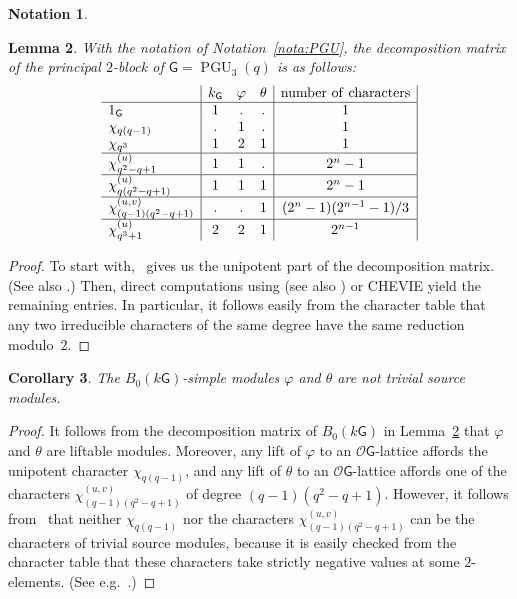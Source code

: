 \documentclass[12pt,a4paper]{amsart}
\theoremstyle{plain}\newtheorem{Theorem}{Theorem}[section]
\theoremstyle{plain}\newtheorem{Conjecture}[Theorem]{Conjecture}
\theoremstyle{plain}\newtheorem{Corollary}[Theorem]{Corollary}
\theoremstyle{plain}\newtheorem{Lemma}[Theorem]{Lemma}
\theoremstyle{plain}\newtheorem{Proposition}[Theorem]{Proposition}
\theoremstyle{definition}\newtheorem{Definition}[Theorem]{Definition}
\theoremstyle{definition}\newtheorem{Example}[Theorem]{Example}
\theoremstyle{definition}\newtheorem{Examples}[Theorem]{Examples}
\theoremstyle{definition}\newtheorem{Remark}[Theorem]{Remark}
\theoremstyle{definition}\newtheorem{Question}[Theorem]{Question}
\theoremstyle{definition}\newtheorem{Notation}[Theorem]{Notation}
\theoremstyle{definition}\newtheorem{Hypothesis}[Theorem]{Hypothesis}
\theoremstyle{definition}\newtheorem{Assumption}[Theorem]{Assumption}
\theoremstyle{definition}\newtheorem{Strategy}[Theorem]{Strategy}
\theoremstyle{definition}\newtheorem{Contents}[Theorem]{Contents}
\theoremstyle{definition}\newtheorem{Computations}[Theorem]{Computations}
\theoremstyle{definition}\newtheorem{Equivalences}[Theorem]{Equivalences}
\theoremstyle{definition}\newtheorem{Notation/Definition}[Theorem]{Notation/Definition}
\theoremstyle{definition}\newtheorem{noth}[Theorem]{}
\theoremstyle{plain}\newtheorem{Step}[Theorem]{Step}
\newcommand{\PGU}{\operatorname{PGU}}
\begin{document}
\begin{Notation}
\end{Notation}




\begin{Lemma}\label{lem:2decPSU3}
With the notation of Notation~\ref{nota:PGU}, the decomposition matrix of the principal $2$-block of $\mathsf{G}=\PGU_3(q)$ is as follows:
%
$$
\begin{array}{l|ccc|c|c} & k_{\mathsf{G}} &\varphi &\theta &\mathrm{number \ of \ characters}\\ 
\noalign{\hrule }
1_{\mathsf{G}}   & 1& . & . & 1 \\ 
\chi_{q(q-1)}& . & 1&.& 1 \\
\chi_{q^3}&1& 2&1& 1 \\
\hline
\chi_{q^2-q+1}^{(u)}&1&1& . & 2^n-1 \\ 
\hline
\chi_{q(q^2-q+1)}^{(u)}&1&1&1&2^n-1 \\
\hline
\chi_{(q-1)(q^2-q+1)}^{\color{black}(u,v)}& . & . &1& (2^n-1)(2^{n-1}-1)/3\\
\hline
\chi_{q^3+1}^{(u)}&2&2&1& 2^{n-1}
\end{array}
$$
\end{Lemma}
\begin{proof}
To start with,~\cite[Appendix]{His04} gives us the unipotent part of the decomposition matrix. (See also \cite[Table 4.5]{GJ11}.)
Then, direct computations using \cite[Table 1.1 and Table 3.1]{Gec90} (see also \cite{SF73}) or {\sf CHEVIE} \cite{Chev} yield the remaining entries. 
In particular, it follows easily from the character table that any two irreducible characters of the same degree have the same reduction modulo~$2$. 
\end{proof}



\begin{Corollary}\label{cor:simplesPSU(q)}%
The $B_{0}(k\mathsf{G})$-simple modules $\varphi$ and $\theta$ are not trivial source modules.
\end{Corollary}
%
\begin{proof}
It follows from the decomposition matrix of $B_{0}(k\mathsf{G})$ in Lemma~\ref{lem:2decPSU3} that $\varphi$ and $\theta$ are liftable modules.
Moreover, any lift of $\varphi$ to an $\mathcal{O}\mathsf{G}$-lattice affords the unipotent character $\chi^{}_{q(q-1)}$, and any lift of $\theta$ to an $\mathcal{O}\mathsf{G}$-lattice affords one of the characters $\chi_{(q-1)(q^2-q+1)}^{(u,v)}$ of degree $(q-1)(q^2-q+1)$. However, it follows from~\cite[II Theorem 12.4(iii)]{Lan83} that neither $\chi^{}_{q(q-1)}$ nor the characters  $\chi_{(q-1)(q^2-q+1)}^{(u,v)}$ can be the characters of trivial source modules, because it is easily checked from the character table that these characters take strictly negative values at some $2$-elements. (See e.g.~\cite[Table~3.1]{Gec90}.)
\end{proof}
\end{document}
